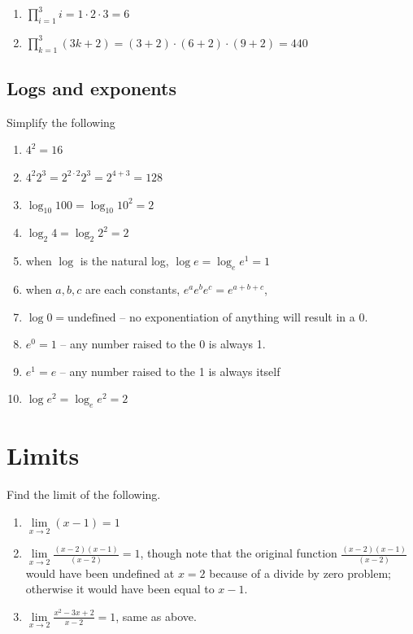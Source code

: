 \documentclass[
  letterpaper,
]{book}
\providecommand{\tightlist}{%
  \setlength{\itemsep}{0pt}\setlength{\parskip}{0pt}}\usepackage{longtable,booktabs,array}
\theoremstyle{definition}
\theoremstyle{definition}
\theoremstyle{plain}
\theoremstyle{definition}
\theoremstyle{plain}
\theoremstyle{plain}
\theoremstyle{remark}
\begin{document}
\begin{enumerate}
\def\labelenumi{\arabic{enumi}.}
\item
  \(\prod\limits_{i= 1}^3 i = 1\cdot 2\cdot 3 = 6\)
\item
  \(\prod\limits_{k=1}^3(3k + 2) = (3 + 2)\cdot (6 + 2)\cdot (9 + 2) = 440\)
\end{enumerate}

\hypertarget{logs-and-exponents-1}{%
\subsection*{Logs and exponents}\label{logs-and-exponents-1}}

Simplify the following

\begin{enumerate}
\def\labelenumi{\arabic{enumi}.}
\tightlist
\item
  \(4^2 = 16\)
\item
  \(4^2 2^3 = 2^{2\cdot 2}2^{3} = 2^{4 + 3} = 128\)
\item
  \(\log_{10}100 = \log_{10}10^2 = 2\)
\item
  \(\log_{2}4 = \log_{2}2^2 = 2\)
\item
  when \(\log\) is the natural log, \(\log e = \log_{e} e^1 = 1\)
\item
  when \(a, b, c\) are each constants, \(e^a e^b e^c = e^{a + b + c}\),
\item
  \(\log 0 = \text{undefined}\) -- no exponentiation of anything will
  result in a 0.
\item
  \(e^0 = 1\) -- any number raised to the 0 is always 1.
\item
  \(e^1 = e\) -- any number raised to the 1 is always itself
\item
  \(\log e^2 = \log_e e^2 = 2\)
\end{enumerate}

\hypertarget{limits-1}{%
\section*{Limits}\label{limits-1}}

Find the limit of the following.

\begin{enumerate}
\def\labelenumi{\arabic{enumi}.}
\tightlist
\item
  \(\lim\limits_{x \to 2} (x - 1) = 1\)
\item
  \(\lim\limits_{x \to 2} \frac{(x - 2) (x - 1)}{(x - 2)} = 1\), though
  note that the original function \(\frac{(x - 2) (x - 1)}{(x - 2)}\)
  would have been undefined at \(x = 2\) because of a divide by zero
  problem; otherwise it would have been equal to \(x - 1\).
\item
  \(\lim\limits_{x \to 2}\frac{x^2 - 3x + 2}{x- 2} = 1\), same as above.
\end{enumerate}
\end{document}

